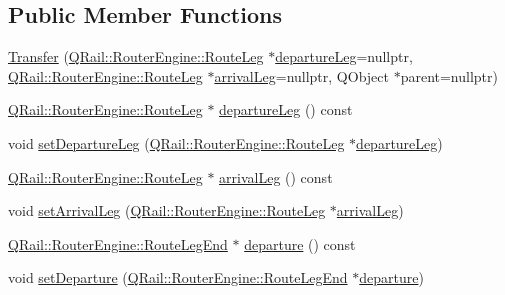 \subsection*{Public Member Functions}
\begin{DoxyCompactItemize}
\item 
\mbox{\hyperlink{classQRail_1_1RouterEngine_1_1Transfer_a1887de7a5b517e613c79a52d3b0edaf9}{Transfer}} (\mbox{\hyperlink{classQRail_1_1RouterEngine_1_1RouteLeg}{Q\+Rail\+::\+Router\+Engine\+::\+Route\+Leg}} $\ast$\mbox{\hyperlink{classQRail_1_1RouterEngine_1_1Transfer_a3013385c1e0d26a15bcb542f614453e1}{departure\+Leg}}=nullptr, \mbox{\hyperlink{classQRail_1_1RouterEngine_1_1RouteLeg}{Q\+Rail\+::\+Router\+Engine\+::\+Route\+Leg}} $\ast$\mbox{\hyperlink{classQRail_1_1RouterEngine_1_1Transfer_ad939a95d1c7eb938f585892e099a5ce2}{arrival\+Leg}}=nullptr, Q\+Object $\ast$parent=nullptr)
\item 
\mbox{\hyperlink{classQRail_1_1RouterEngine_1_1RouteLeg}{Q\+Rail\+::\+Router\+Engine\+::\+Route\+Leg}} $\ast$ \mbox{\hyperlink{classQRail_1_1RouterEngine_1_1Transfer_a3013385c1e0d26a15bcb542f614453e1}{departure\+Leg}} () const
\item 
void \mbox{\hyperlink{classQRail_1_1RouterEngine_1_1Transfer_a6859f11de7d52221dedf2992c0574e01}{set\+Departure\+Leg}} (\mbox{\hyperlink{classQRail_1_1RouterEngine_1_1RouteLeg}{Q\+Rail\+::\+Router\+Engine\+::\+Route\+Leg}} $\ast$\mbox{\hyperlink{classQRail_1_1RouterEngine_1_1Transfer_a3013385c1e0d26a15bcb542f614453e1}{departure\+Leg}})
\item 
\mbox{\hyperlink{classQRail_1_1RouterEngine_1_1RouteLeg}{Q\+Rail\+::\+Router\+Engine\+::\+Route\+Leg}} $\ast$ \mbox{\hyperlink{classQRail_1_1RouterEngine_1_1Transfer_ad939a95d1c7eb938f585892e099a5ce2}{arrival\+Leg}} () const
\item 
void \mbox{\hyperlink{classQRail_1_1RouterEngine_1_1Transfer_a0fd3d974fc24be429574228d714403ce}{set\+Arrival\+Leg}} (\mbox{\hyperlink{classQRail_1_1RouterEngine_1_1RouteLeg}{Q\+Rail\+::\+Router\+Engine\+::\+Route\+Leg}} $\ast$\mbox{\hyperlink{classQRail_1_1RouterEngine_1_1Transfer_ad939a95d1c7eb938f585892e099a5ce2}{arrival\+Leg}})
\item 
\mbox{\hyperlink{classQRail_1_1RouterEngine_1_1RouteLegEnd}{Q\+Rail\+::\+Router\+Engine\+::\+Route\+Leg\+End}} $\ast$ \mbox{\hyperlink{classQRail_1_1RouterEngine_1_1Transfer_a005159d3475c72f6425e67ae1a7e2d9d}{departure}} () const
\item 
void \mbox{\hyperlink{classQRail_1_1RouterEngine_1_1Transfer_aa2fc712b52826e04886c083fd54b12eb}{set\+Departure}} (\mbox{\hyperlink{classQRail_1_1RouterEngine_1_1RouteLegEnd}{Q\+Rail\+::\+Router\+Engine\+::\+Route\+Leg\+End}} $\ast$\mbox{\hyperlink{classQRail_1_1RouterEngine_1_1Transfer_a005159d3475c72f6425e67ae1a7e2d9d}{departure}})

\end{DoxyCompactItemize}
